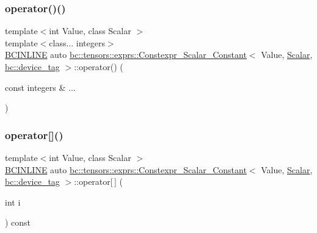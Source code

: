 \subsubsection{\texorpdfstring{operator()()}{operator()()}\hspace{0.1cm}{\footnotesize\ttfamily [2/2]}}
{\footnotesize\ttfamily template$<$int Value, class Scalar $>$ \\
template$<$class... integers$>$ \\
\hyperlink{common_8h_a6699e8b0449da5c0fafb878e59c1d4b1}{B\+C\+I\+N\+L\+I\+NE} auto \hyperlink{structbc_1_1tensors_1_1exprs_1_1Constexpr__Scalar__Constant}{bc\+::tensors\+::exprs\+::\+Constexpr\+\_\+\+Scalar\+\_\+\+Constant}$<$ Value, \hyperlink{namespacebc_aa12ac55ee2c43dc082894dd3859daee1}{Scalar}, \hyperlink{structbc_1_1device__tag}{bc\+::device\+\_\+tag} $>$\+::operator() (\begin{DoxyParamCaption}\item[{const integers \&}]{... }\end{DoxyParamCaption})\hspace{0.3cm}{\ttfamily [inline]}}

\mbox{\label{structbc_1_1tensors_1_1exprs_1_1Constexpr__Scalar__Constant_3_01Value_00_01Scalar_00_01bc_1_1device__tag_01_4_ab838f9e102c917edcfb4d514616ccf3e}} 
\subsubsection{\texorpdfstring{operator[]()}{operator[]()}\hspace{0.1cm}{\footnotesize\ttfamily [1/2]}}
{\footnotesize\ttfamily template$<$int Value, class Scalar $>$ \\
\hyperlink{common_8h_a6699e8b0449da5c0fafb878e59c1d4b1}{B\+C\+I\+N\+L\+I\+NE} auto \hyperlink{structbc_1_1tensors_1_1exprs_1_1Constexpr__Scalar__Constant}{bc\+::tensors\+::exprs\+::\+Constexpr\+\_\+\+Scalar\+\_\+\+Constant}$<$ Value, \hyperlink{namespacebc_aa12ac55ee2c43dc082894dd3859daee1}{Scalar}, \hyperlink{structbc_1_1device__tag}{bc\+::device\+\_\+tag} $>$\+::operator\mbox{[}$\,$\mbox{]} (\begin{DoxyParamCaption}\item[{int}]{i }\end{DoxyParamCaption}) const\hspace{0.3cm}{\ttfamily [inline]}}

